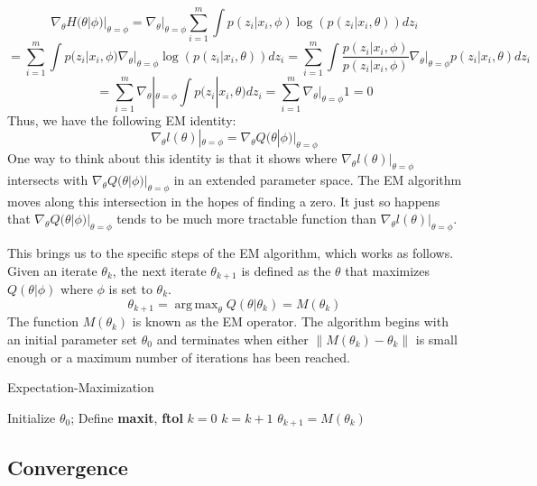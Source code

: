 \documentclass[letter,12pt]{article}
\DeclareMathOperator*{\argmax}{arg\,max}
\begin{document}
\[
\nabla_{\theta}H(\theta|\phi)|_{\theta = \phi}
=
\nabla_{\theta}|_{\theta = \phi}\sum_{i=1}^{m} \int p(z_i|x_i,\phi) \log \left(p(z_i|x_i,\theta)\right) dz_i
\]
\[
=
\sum_{i=1}^{m} 
\int p(z_i|x_i,\phi) 
\nabla_{\theta}|_{\theta = \phi}
\log \left(p(z_i|x_i,\theta)\right) dz_i
=
\sum_{i=1}^{m} 
\int \dfrac{p(z_i|x_i,\phi)}{p(z_i|x_i,\phi)} 
\nabla_{\theta}|_{\theta = \phi}
p(z_i|x_i,\theta) dz_i
\]
\[
=
\sum_{i=1}^{m} 
\nabla_{\theta}|_{\theta = \phi}
\int 
p(z_i|x_i,\theta) dz_i
=
\sum_{i=1}^{m} 
\nabla_{\theta}|_{\theta = \phi}
1
=0
\]
Thus, we have the following EM identity:
\begin{equation} \label{eq:dl_is_dq}
\nabla_{\theta}l(\theta)|_{\theta = \phi}
=
\nabla_{\theta}Q(\theta|\phi)|_{\theta = \phi}
\end{equation}
One way to think about this identity is that it shows where $\nabla_{\theta}l(\theta)|_{\theta = \phi}$ intersects with  $\nabla_{\theta}Q(\theta|\phi)|_{\theta = \phi}$ in an extended parameter space.  The EM algorithm moves along this intersection in the hopes of finding a zero.  It just so happens that $\nabla_{\theta}Q(\theta|\phi)|_{\theta = \phi}$ tends to be much more tractable function than $\nabla_{\theta}l(\theta)|_{\theta = \phi}$.  

This brings us to the specific steps of the EM algorithm, which works as follows.  Given an iterate $\theta_k$, the next iterate $\theta_{k+1}$ is defined as the $\theta$ that maximizes $Q(\theta|\phi)$ where $\phi$ is set to $\theta_k$.
\[
\theta_{k+1} = \argmax_{\theta}  Q(\theta|\theta_k) = M(\theta_k)
\]
The function $M(\theta_k)$ is known as the EM operator.  The algorithm begins with an initial parameter set $\theta_0$ and terminates when either $\|M(\theta_k)-\theta_k\|$ is small enough or a maximum number of iterations has been reached.


\begin{algorithm}
\caption{Expectation-Maximization}
\label{alg:em}
\begin{algorithmic}[1]
\State Initialize $\theta_0$; Define \textbf{maxit}, \textbf{ftol}
\State $k = 0$
\State $k = k+1$
\State $\theta_{k+1} = M(\theta_k)$
\EndWhile
\end{algorithmic}
\end{algorithm}

\subsection{Convergence} \label{section:convergence}
\end{document}
